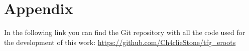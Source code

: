 \documentclass[a4paper,11pt, titlepage, twoside]{article}
\begin{document}
\section*{Appendix}\label{Appendix}

In the following link you can find the Git repository with all the code used for the development of this work:
\url{https://github.com/Ch4rlieStone/tfg_eroots}
 
\end{document}
